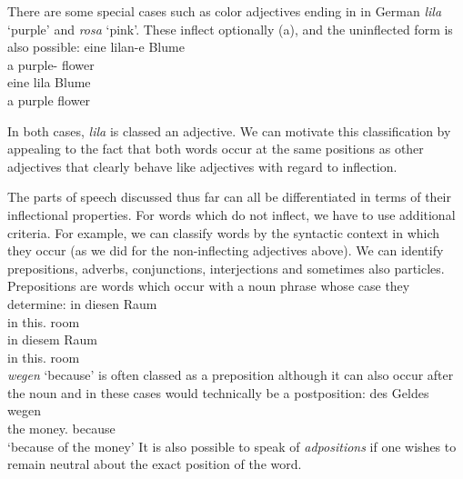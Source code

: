 There are some special cases such as color adjectives ending in  in German \emph{lila} `purple' and \emph{rosa} `pink'.
These inflect optionally (a), and the uninflected form is also possible:
\eal
\ex 
\gll eine lilan-e Blume\\
	 a purple-\fem{} flower\\
\ex 
\gll eine lila Blume\\
	 a purple flower\\
\zl

\noindent
In both cases, \emph{lila} is classed an adjective. We can motivate this classification by appealing to the fact that both words occur
at the same positions as other adjectives that clearly behave like adjectives with regard to inflection.

The parts of speech discussed thus far can all be differentiated in terms of their inflectional properties. For words which do not inflect,
we have to use additional criteria. For example, we can classify words by the syntactic context in which they occur (as we did for the 
non-inflecting adjectives above). We can identify prepositions, adverbs,
conjunctions, interjections and sometimes also particles.
Prepositions are words which occur with a noun phrase whose case they determine:
\eal
\ex 
\gll in diesen Raum\\
	 in this.\acc{} room\\
\ex 
\gll in diesem Raum\\
	 in this.\dat{} room\\
\zl
\emph{wegen} `because' is often classed as a preposition although it can also occur after the noun and in these cases would technically be a
postposition:
\ea
\gll des Geldes wegen\\
	 the money.\gen{} because\\
\glt `because of the money'
\z
It is also possible to speak of \emph{adpositions} if one wishes to remain neutral about the exact position of the word.

